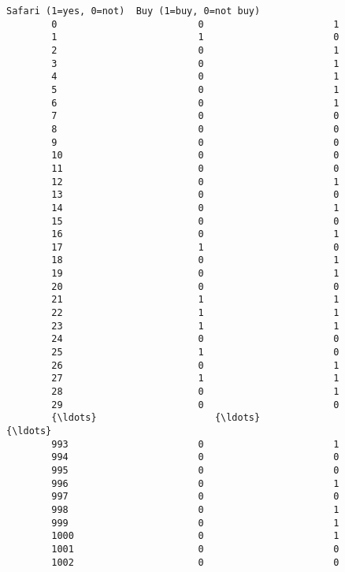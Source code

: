 \documentclass[11pt]{article}
\begin{document}
\begin{Verbatim}[commandchars=\\\{\}]
              Safari (1=yes, 0=not)  Buy (1=buy, 0=not buy)  
        0                         0                       1  
        1                         1                       0  
        2                         0                       1  
        3                         0                       1  
        4                         0                       1  
        5                         0                       1  
        6                         0                       1  
        7                         0                       0  
        8                         0                       0  
        9                         0                       0  
        10                        0                       0  
        11                        0                       0  
        12                        0                       1  
        13                        0                       0  
        14                        0                       1  
        15                        0                       0  
        16                        0                       1  
        17                        1                       0  
        18                        0                       1  
        19                        0                       1  
        20                        0                       0  
        21                        1                       1  
        22                        1                       1  
        23                        1                       1  
        24                        0                       0  
        25                        1                       0  
        26                        0                       1  
        27                        1                       1  
        28                        0                       1  
        29                        0                       0  
        {\ldots}                     {\ldots}                     {\ldots}  
        993                       0                       1  
        994                       0                       0  
        995                       0                       0  
        996                       0                       1  
        997                       0                       0  
        998                       0                       1  
        999                       0                       1  
        1000                      0                       1  
        1001                      0                       0  
        1002                      0                       0  

\end{Verbatim}
\end{document}
